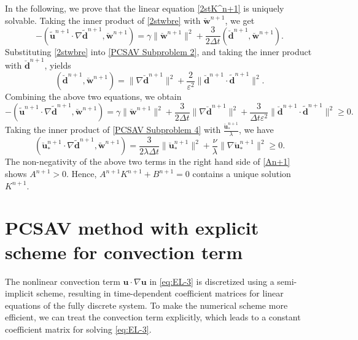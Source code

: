 \documentclass[12pt,reqno]{amsart}
\numberwithin{equation}{section}
\newcommand{\uu}{\mathrm{\textbf{u}}}
\newcommand{\dd}{\mathrm{\textbf{d}}}
\newcommand{\ww}{\mathrm{\textbf{w}}}
\begin{document}
In the following, we prove that the linear equation \eqref{2stK^n+1} is uniquely solvable.
Taking the inner product of \eqref{2stwbre} with $\breve{\ww}^{n+1}$, we get
\[
-\left( \tilde{\uu}^{n+1} \cdot \nabla \tilde{\dd}^{n+1} ,\breve{\ww}^{n+1}\right)   
=\gamma\|\breve{\ww}^{n+1}\|^2 + \frac{3}{2\Delta t}(\breve{\dd}^{n+1}, \breve{\ww}^{n+1}).
\]
Substituting \eqref{2stwbre} into \eqref{PCSAV Subproblem 2}, and taking the inner product with $\breve{\dd}^{n+1}$, yields
\[
(\breve{\dd}^{n+1},\breve{\ww}^{n+1}) = \|\nabla\breve{\dd}^{n+1}\|^2 + \frac{2}{\varepsilon^2}\|\breve{\dd}^{n+1}\cdot\tilde{\dd}^{n+1}\|^2.
\]
Combining the above two equations, we obtain
\[
-\left( \tilde{\uu}^{n+1} \cdot \nabla \tilde{\dd}^{n+1} ,\breve{\ww}^{n+1}\right) 
=\gamma\|\breve{\ww}^{n+1}\|^2 + \frac{3}{2\Delta t}\|\nabla\breve{\dd}^{n+1}\|^2 + \frac{3}{\Delta t\varepsilon^2}\|\breve{\dd}^{n+1}\cdot\tilde{\dd}^{n+1}\|^2 \geq 0.
\]
Taking the inner product of \eqref{PCSAV Subproblem 4} with $\frac{\breve{\uu}_*^{n+1}}{\lambda}$, we have
\[
\left(\breve{\uu}_*^{n+1} \cdot \nabla \tilde{\dd}^{n+1} ,\tilde{\ww}^{n+1}\right) = \frac{3}{2\lambda\Delta t}\|\breve{\uu}_*^{n+1}\|^2 + \frac{\nu}{\lambda}\|\nabla\breve{\uu}_*^{n+1}\|^2 \geq 0.
\]
The non-negativity of the above two terms in the right hand side of \eqref{An+1} shows $A^{n+1} > 0$. Hence, $A^{n+1}K^{n+1} + B^{n+1} = 0$ contains a unique solution $K^{n+1}$.	


\section{PCSAV method with explicit scheme for convection term}\label{sec:PCSAV-ECT}
The nonlinear convection term $\uu\cdot\nabla\uu$ in \eqref{eq:EL-3} is discretized using a semi-implicit scheme, resulting in time-dependent coefficient matrices for linear equations of the fully discrete system. 
To make the numerical scheme more efficient, we can treat the convection term explicitly, which leads to a constant coefficient matrix for solving \eqref{eq:EL-3}.
\end{document}
